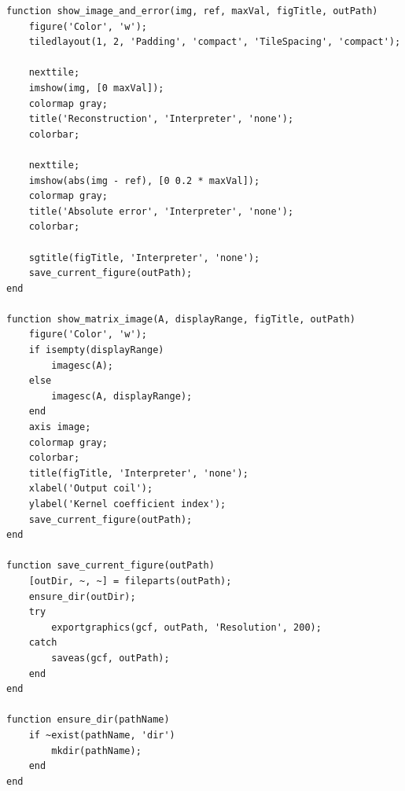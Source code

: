 ﻿\documentclass[11pt]{article}
\begin{document}
\begin{lstlisting}[style=matlabstyle]
function show_image_and_error(img, ref, maxVal, figTitle, outPath)
    figure('Color', 'w');
    tiledlayout(1, 2, 'Padding', 'compact', 'TileSpacing', 'compact');

    nexttile;
    imshow(img, [0 maxVal]);
    colormap gray;
    title('Reconstruction', 'Interpreter', 'none');
    colorbar;

    nexttile;
    imshow(abs(img - ref), [0 0.2 * maxVal]);
    colormap gray;
    title('Absolute error', 'Interpreter', 'none');
    colorbar;

    sgtitle(figTitle, 'Interpreter', 'none');
    save_current_figure(outPath);
end

function show_matrix_image(A, displayRange, figTitle, outPath)
    figure('Color', 'w');
    if isempty(displayRange)
        imagesc(A);
    else
        imagesc(A, displayRange);
    end
    axis image;
    colormap gray;
    colorbar;
    title(figTitle, 'Interpreter', 'none');
    xlabel('Output coil');
    ylabel('Kernel coefficient index');
    save_current_figure(outPath);
end

function save_current_figure(outPath)
    [outDir, ~, ~] = fileparts(outPath);
    ensure_dir(outDir);
    try
        exportgraphics(gcf, outPath, 'Resolution', 200);
    catch
        saveas(gcf, outPath);
    end
end

function ensure_dir(pathName)
    if ~exist(pathName, 'dir')
        mkdir(pathName);
    end
end
\end{lstlisting}
\end{document}
